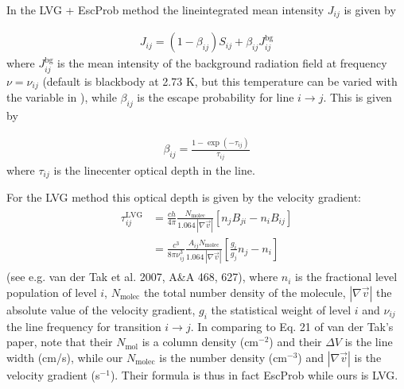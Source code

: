 \documentclass[letterpaper,10pt,english]{sphinxmanual}
\begin{document}
In the LVG + EscProb method the line\sphinxhyphen{}integrated mean intensity \(J_{ij}\) is
given by

\label{\detokenize{lineradtrans:eq-linemeanint-escp}}\begin{equation*}
\begin{split}J_{ij} = (1-\beta_{ij})S_{ij} + \beta_{ij}J_{ij}^{\mathrm{bg}}\end{split}
\end{equation*}
where \(J_{ij}^{\mathrm{bg}}\) is the mean intensity of the background
radiation field at frequency \(\nu=\nu_{ij}\) (default is blackbody at 2.73 K,
but this temperature can be varied with the  variable
in ), while \(\beta_{ij}\) is the escape probability
for line \(i\rightarrow j\). This is given by

\label{\detokenize{lineradtrans:eq-escprob-beta-formula}}\begin{equation*}
\begin{split}\beta_{ij} = \frac{1-\exp(-\tau_{ij})}{\tau_{ij}}\end{split}
\end{equation*}
where \(\tau_{ij}\) is the line\sphinxhyphen{}center optical depth in the line.

For the LVG method this optical depth is given by the velocity gradient:
\begin{equation*}
\begin{split}\begin{split}
\tau_{ij}^{\mathrm{LVG}} & = \frac{ch}{4\pi}\frac{N_{\mathrm{molec}}}
{1.064\,|\nabla \vec v|}\left[n_jB_{ji}-n_iB_{ij}\right]\\
&= \frac{c^3}{8\pi \nu_{ij}^3}\frac{A_{ij}N_{\mathrm{molec}}}
{1.064\,|\nabla \vec v|}\left[\frac{g_i}{g_j}n_j-n_i\right]
\end{split}\end{split}
\end{equation*}
(see e.g. van der Tak et al. 2007, A\&A 468, 627), where \(n_i\) is the
fractional level population of level \(i\), \(N_{\mathrm{molec}}\) the
total number density of the molecule, \(|\nabla \vec v|\) the absolute value
of the velocity gradient, \(g_i\) the statistical weight of level \(i\)
and \(\nu_{ij}\) the line frequency for transition \(i\rightarrow
j\). In comparing to Eq. 21 of van der Tak’s paper, note that their
\(N_{\mathrm{mol}}\) is a column density (cm\(^{-2}\)) and their
\(\Delta V\) is the line width (cm/s), while our \(N_{\mathrm{molec}}\)
is the number density (cm\(^{-3}\)) and \(|\nabla \vec v|\) is the
velocity gradient (s\(^{-1}\)). Their formula is thus in fact EscProb while
ours is LVG.
\end{document}
